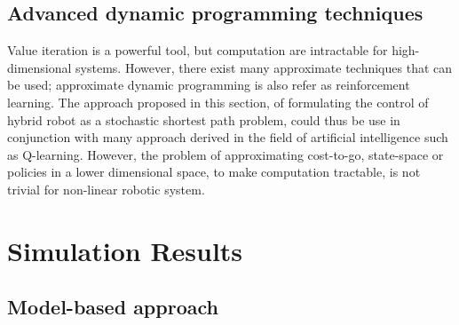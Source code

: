 \subsection{Advanced dynamic programming techniques}

Value iteration is a powerful tool, but computation are intractable for high-dimensional systems. However, there exist many approximate techniques that can be used; approximate dynamic programming is also refer as reinforcement learning. The approach proposed in this section, of formulating the control of hybrid robot as a stochastic shortest path problem, could thus be use in conjunction with many approach derived in the field of artificial intelligence such as Q-learning. However, the problem of approximating cost-to-go, state-space or policies in a lower dimensional space, to make computation tractable, is not trivial for non-linear robotic system.


\newpage
\section{Simulation Results}
\label{sec:shift_sim}


\subsection{Model-based approach}

